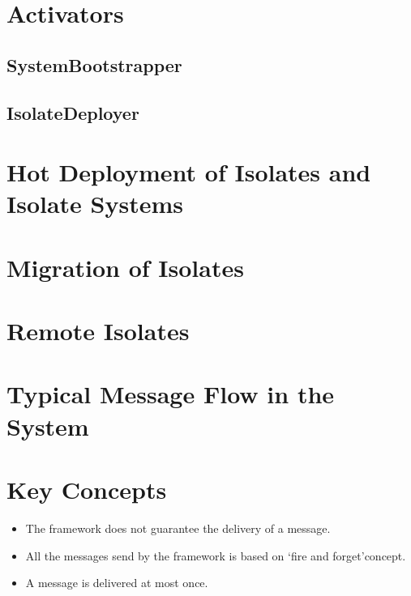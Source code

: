 \section{Activators}
\subsection{SystemBootstrapper}
\subsection{IsolateDeployer}

\section{Hot Deployment of Isolates and Isolate Systems}

\section{Migration of Isolates}

\section{Remote Isolates}

\section{Typical Message Flow in the System}

\section{Key Concepts}

\begin{itemize}
  \item The framework does not guarantee the delivery of a message.
  \item All the messages send by the framework is based on ‘fire and forget’concept.
  \item A message is delivered at most once.

\end{itemize}
